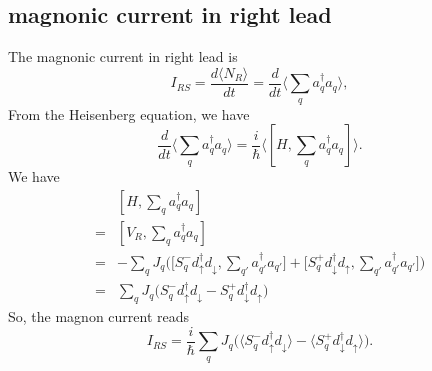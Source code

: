 \documentclass[11pt,a4paper]{article}
\begin{document}
\subsection{magnonic current in right lead}
The magnonic current in right lead is
\begin{equation}
I_{RS} = \frac{d\langle N_{R}\rangle}{dt} =  \frac{d}{dt} \langle \sum_{q}a_{q}^{\dag}a_{q}\rangle,
\end{equation}
From the Heisenberg equation, we have
\begin{equation}
\frac{d}{dt} \langle \sum_{q}a_{q}^{\dag}a_{q}\rangle = \frac{i}{\hbar} \langle [H, \sum_{q}a_{q}^{\dag}a_{q}] \rangle.
\end{equation}
We have
\begin{equation}
\begin{split}
&[H, \sum_{q}a_{q}^{\dag}a_{q}] \\
= &[V_{R}, \sum_{q}a_{q}^{\dag}a_{q}]\\
= &-\sum_{q} J_{q} \Big(\big[S_{q}^{-}d_{\uparrow}^{\dag}d_{\downarrow}, \sum_{q'}a_{q'}^{\dag}a_{q'}\big] + \big[S_{q}^{+}d_{\downarrow}^{\dag}d_{\uparrow}, \sum_{q'}a_{q'}^{\dag}a_{q'}\big]\Big) \\
= & \sum_{q} J_{q} \big( S_{q}^{-}d_{\uparrow}^{\dag}d_{\downarrow} - S_{q}^{+}d_{\downarrow}^{\dag}d_{\uparrow} \big)
\end{split}
\end{equation}
So, the magnon current reads
\begin{equation}
I_{RS} = \frac{i}{\hbar} \sum_{q} J_{q} \big( \big\langle S_{q}^{-}d_{\uparrow}^{\dag}d_{\downarrow}\big\rangle - \big\langle S_{q}^{+}d_{\downarrow}^{\dag}d_{\uparrow} \big\rangle \big) .
\end{equation}
\end{document}
